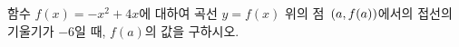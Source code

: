 함수 $f(x)=-x^2+4x$에 대하여 곡선 $y=f(x)$ 위의 점~$(a{,}\mkern3mu\mathopen{}f(a))$에서의 접선의 기울기가 $-6$일 때, $f(a)$의 값을 구하시오.
